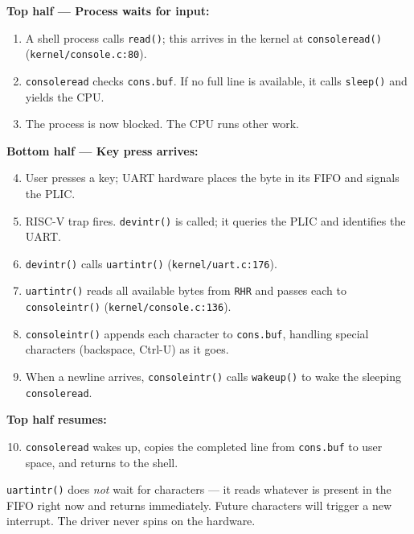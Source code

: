 \documentclass[11pt, a4paper]{article}
\begin{document}
\begin{tcolorbox}[lifecycle, title={Console Input Lifecycle}]
\textbf{Top half --- Process waits for input:}
\begin{enumerate}[leftmargin=1.8em, itemsep=0.25em]
  \item A shell process calls \lstinline|read()|; this arrives in the kernel at \lstinline|consoleread()| (\lstinline|kernel/console.c:80|).
  \item \lstinline|consoleread| checks \lstinline|cons.buf|. If no full line is available, it calls \lstinline|sleep()| and yields the CPU.
  \item The process is now blocked. The CPU runs other work.
\end{enumerate}

\medskip
\textbf{Bottom half --- Key press arrives:}
\begin{enumerate}[leftmargin=1.8em, itemsep=0.25em]
  \setcounter{enumi}{3}
  \item User presses a key; UART hardware places the byte in its FIFO and signals the PLIC.
  \item RISC-V trap fires. \lstinline|devintr()| is called; it queries the PLIC and identifies the UART.
  \item \lstinline|devintr()| calls \lstinline|uartintr()| (\lstinline|kernel/uart.c:176|).
  \item \lstinline|uartintr()| reads all available bytes from \lstinline|RHR| and passes each to \lstinline|consoleintr()| (\lstinline|kernel/console.c:136|).
  \item \lstinline|consoleintr()| appends each character to \lstinline|cons.buf|, handling special characters (backspace, Ctrl-U) as it goes.
  \item When a newline arrives, \lstinline|consoleintr()| calls \lstinline|wakeup()| to wake the sleeping \lstinline|consoleread|.
\end{enumerate}

\medskip
\textbf{Top half resumes:}
\begin{enumerate}[leftmargin=1.8em, itemsep=0.25em]
  \setcounter{enumi}{9}
  \item \lstinline|consoleread| wakes up, copies the completed line from \lstinline|cons.buf| to user space, and returns to the shell.
\end{enumerate}
\end{tcolorbox}

\begin{tcolorbox}[impldetail]
\lstinline|uartintr()| does \emph{not} wait for characters --- it reads whatever is present in the FIFO right now and returns immediately. Future characters will trigger a new interrupt. The driver never spins on the hardware.
\end{tcolorbox}
\end{document}
